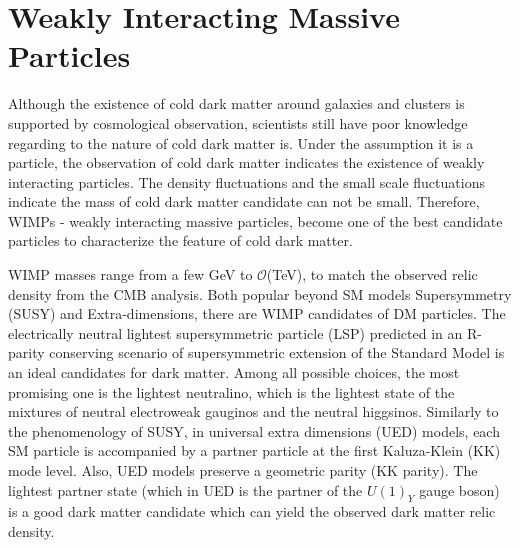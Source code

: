 \section{Weakly Interacting Massive Particles}
\label{sec:dms2}
\par Although the existence of cold dark matter around galaxies and clusters is supported by cosmological observation, scientists still have poor knowledge regarding to the nature of cold dark matter is. Under the assumption it is a particle, the observation of cold dark matter indicates the existence of weakly interacting particles. The density fluctuations and the small scale fluctuations indicate the mass of cold dark matter candidate can not be small. Therefore, WIMPs - weakly interacting massive particles, become one of the best candidate particles to characterize the feature of cold dark matter.

\par WIMP masses range from a few GeV to $\mathcal{O}$(TeV), to match the observed relic density from the CMB analysis. Both popular beyond SM models Supersymmetry (SUSY) and Extra-dimensions, there are WIMP candidates of DM particles. The electrically neutral lightest supersymmetric particle (LSP) predicted in an R-parity conserving scenario of supersymmetric extension of the Standard Model is an ideal candidates for dark matter. Among all possible choices, the most promising one is the lightest neutralino, which is the lightest state of the mixtures of neutral electroweak gauginos and the neutral higgsinos\cite{Feng:2010gw}. Similarly to the phenomenology of SUSY, in universal extra dimensions (UED) models, each SM particle is accompanied by a partner particle at the first Kaluza-Klein (KK) mode level. Also, UED models preserve a geometric parity (KK parity). The lightest partner state (which in UED is the partner of the $U(1)_Y$ gauge boson) is a good dark matter candidate which can yield the observed dark matter relic density\cite{Servant:2002aq}.

